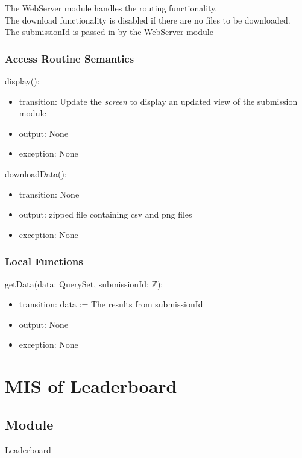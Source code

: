 \documentclass[12pt, titlepage]{article}
\begin{document}
The WebServer module handles the routing functionality. \\
The download functionality is disabled if there are no files to be downloaded. \\
The submissionId is passed in by the WebServer module

\subsubsection{Access Routine Semantics}

\noindent display():
\begin{itemize}
\item transition: Update the \textit{screen} to display an updated view of the submission module
\item output: None
\item exception: None
\end{itemize}

\noindent downloadData():
\begin{itemize}
\item transition: None
\item output: zipped file containing csv and png files
\item exception: None
\end{itemize}

\subsubsection{Local Functions}

\noindent getData(data: QuerySet, submissionId: $\mathbb{Z}$):
\begin{itemize}
\item transition: data := The results from submissionId
\item output: None
\item exception: None
\end{itemize}

\newpage

\section{MIS of Leaderboard} \label{LeaderboardModule}

\subsection{Module}

Leaderboard
\end{document}
